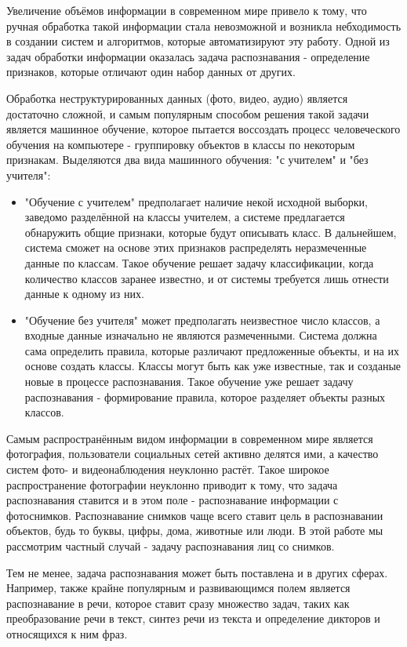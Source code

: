 \documentclass[12pt,a4paper]{article}
\begin{document}
Увеличение объёмов информации в современном мире привело к тому, что ручная обработка такой информации стала невозможной и возникла небходимость в создании систем и алгоритмов, которые автоматизируют эту работу. Одной из задач обработки информации оказалась задача распознавания - определение признаков, которые отличают один набор данных от других.

Обработка неструктурированных данных (фото, видео, аудио) является достаточно сложной, и самым популярным способом решения такой задачи является машинное обучение, которое пытается воссоздать процесс человеческого обучения на компьютере - группировку объектов в классы по некоторым признакам. Выделяются два вида машинного обучения: "с учителем" и "без учителя":
\begin{itemize}
    \item "Обучение с учителем" предполагает наличие некой исходной выборки, заведомо разделённой на классы учителем, а системе предлагается обнаружить общие признаки, которые будут описывать класс. В дальнейшем, система сможет на основе этих признаков распределять неразмеченные данные по классам. Такое обучение решает задачу классификации, когда количество классов заранее известно, и от системы требуется лишь отнести данные к одному из них.
    \item "Обучение без учителя" может предполагать неизвестное число классов, а входные данные изначально не являются размеченными. Система должна сама определить правила, которые различают предложенные объекты, и на их основе создать классы. Классы могут быть как уже известные, так и созданые новые в процессе распознавания. Такое обучение уже решает задачу распознавания - формирование правила, которое разделяет объекты разных классов.
\end{itemize}

Самым распространённым видом информации в современном мире является фотография, пользователи социальных сетей активно делятся ими, а качество систем фото- и видеонаблюдения неуклонно растёт. Такое широкое распространение фотографии неуклонно приводит к тому, что задача распознавания ставится и в этом поле - распознавание информации с фотоснимков. Распознавание снимков чаще всего ставит цель в распознавании объектов, будь то буквы, цифры, дома, животные или люди. В этой работе мы рассмотрим частный случай - задачу распознавания лиц со снимков.

Тем не менее, задача распознавания может быть поставлена и в других сферах. Например, также крайне популярным и развивающимся полем является распознавание в речи, которое ставит сразу множество задач, таких как преобразование речи в текст, синтез речи из текста и определение дикторов и относящихся к ним фраз.
\end{document}
